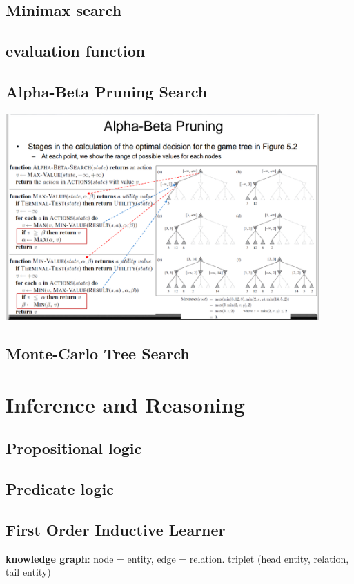 \documentclass[11pt]{article}
\begin{document}
\subsection{Minimax search}
\label{sec:orgb641217}
\subsection{evaluation function}
\label{sec:org5e7d9b1}
\subsection{Alpha-Beta Pruning Search}
\label{sec:org08e356f}
\includegraphics[width=0.9\textwidth]{ABP}
\subsection{Monte-Carlo Tree Search}
\label{sec:org0c7e50e}

\section{Inference and Reasoning}
\label{sec:org900d033}
\subsection{Propositional logic}
\label{sec:org541cbc1}
\subsection{Predicate logic}
\label{sec:org0954370}
\subsection{First Order Inductive Learner}
\label{sec:org03f1de1}
\textbf{knowledge graph}: node = entity, edge = relation.
triplet (head entity, relation, tail entity)
\end{document}
